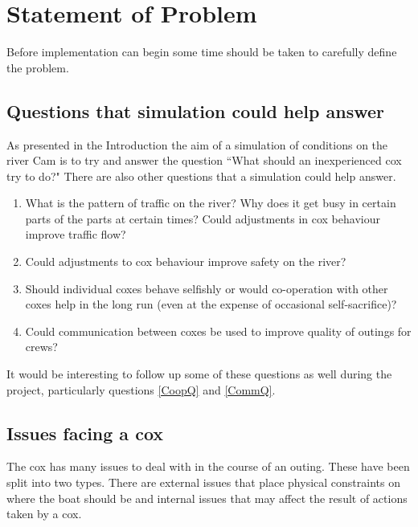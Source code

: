 \chapter{Statement of Problem}

Before implementation can begin some time should be taken to carefully define the problem.

\section{Questions that simulation could help answer}

As presented in the Introduction the aim of a simulation of conditions
on the river Cam is to try and answer the question ``What should an
inexperienced cox try to do?" There are also other questions that a simulation could help answer.

\begin{enumerate}
  \item What is the pattern of traffic on the river? Why does it get busy in certain parts of the parts at certain times? Could adjustments in cox behaviour improve traffic flow?
  \item Could adjustments to cox behaviour improve safety on the river?
  \item \label{CoopQ} Should individual coxes behave selfishly or would co-operation with other coxes help in the long run (even at the expense of occasional self-sacrifice)?
  \item \label{CommQ} Could communication between coxes be used to improve quality of outings for crews?
\end{enumerate}

It would be interesting to follow up some of these questions as well during the project, particularly questions \ref{CoopQ} and \ref{CommQ}.

\section{Issues facing a cox}
The cox has many issues to deal with in the course of an outing. These
have been split into two types. There are external issues that place
physical constraints on where the boat should be and internal issues
that may affect the result of actions taken by a cox. 


